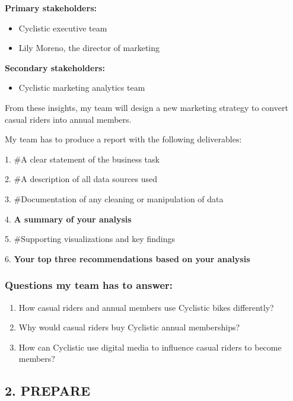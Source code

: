 \documentclass[
]{article}
\providecommand{\tightlist}{%
  \setlength{\itemsep}{0pt}\setlength{\parskip}{0pt}}
\begin{document}
\textbf{Primary stakeholders:}

\begin{itemize}
\item
  Cyclistic executive team
\item
  Lily Moreno, the director of marketing
\end{itemize}

\textbf{Secondary stakeholders:}

\begin{itemize}
\tightlist
\item
  Cyclistic marketing analytics team
\end{itemize}

From these insights, my team will design a new marketing strategy to
convert casual riders into annual members.

My team has to produce a report with the following deliverables:

1. \#A clear statement of the business task

2. \#A description of all data sources used

3. \#Documentation of any cleaning or manipulation of data

4. \textbf{A summary of your analysis}

5. \#Supporting visualizations and key findings

6. \textbf{Your top three recommendations based on your analysis}

\hypertarget{questions-my-team-has-to-answer}{%
\subsubsection{Questions my team has to
answer:}\label{questions-my-team-has-to-answer}}

\begin{enumerate}
\def\labelenumi{\arabic{enumi}.}
\item
  How casual riders and annual members use Cyclistic bikes differently?
\item
  Why would casual riders buy Cyclistic annual memberships?
\item
  How can Cyclistic use digital media to influence casual riders to
  become members?
\end{enumerate}

\hypertarget{prepare}{%
\subsection{2. PREPARE}\label{prepare}}
\end{document}
